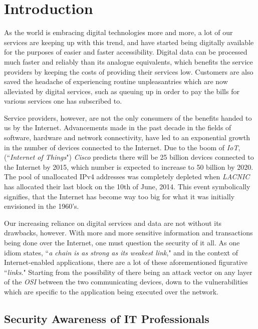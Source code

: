 \documentclass[a4paper,12pt]{article}
\begin{document}
\newpage
\section{Introduction}

	As the world is embracing digital technologies more and more, a lot of our services are keeping up with this trend, and have started being digitally available for the purposes of easier and faster accessibility. Digital data can be processed much faster and reliably than its analogue equivalents, which benefits the service providers by keeping the costs of providing their services low. Customers are also saved the headache of experiencing routine unpleasantries which are now alleviated by digital services, such as queuing up in order to pay the bills for various services one has subscribed to.
	
	Service providers, however, are not the only consumers of the benefits handed to us by the Internet. Advancements made in the past decade in the fields of software, hardware and network connectivity, have led to an exponential growth in the number of devices connected to the Internet. Due to the boom of \textit{IoT}, (``\textit{Internet of Things}") \textit{Cisco} predicts there will be 25 billion devices connected to the Internet by 2015, which number is expected to increase to 50 billion by 2020.\cite{devans11} The pool of unallocated IPv4 addresses was completely depleted when \textit{LACNIC} has allocated their last block on the 10th of June, 2014.\cite{ghouston11} This event symbolically signifies, that the Internet has become way too big for what it was initially envisioned in the 1960's.
	
	Our increasing reliance on digital services and data are not without its drawbacks, however. With more and more sensitive information and transactions being done over the Internet, one must question the security of it all. As one idiom states, ``\textit{a chain is as strong as its weakest link}," and in the context of Internet-enabled applications, there are a lot of these aforementioned figurative ``\textit{links}." Starting from the possibility of there being an attack vector on any layer of the \textit{OSI} between the two communicating devices, down to the vulnerabilities which are specific to the application being executed over the network.
	
\subsection{Security Awareness of IT Professionals}
	
\end{document}
